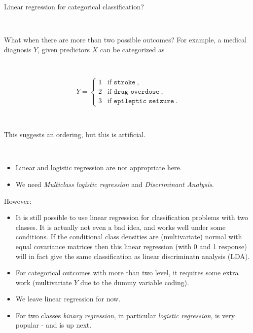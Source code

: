 \documentclass[10pt,ignorenonframetext,]{beamer}
\providecommand{\tightlist}{%
  \setlength{\itemsep}{0pt}\setlength{\parskip}{0pt}}
\begin{document}
\begin{frame}

\begin{block}{Linear regression for categorical classification?}

\(~\)

What when there are more than two possible outcomes? For example, a
medical diagnosis \(Y\), given predictors \(X\) can be categorized as

\(~\)

\[Y = \left\{ \begin{array}{ll}
1 & \text{if } \texttt{stroke} \ , \\
2 & \text{if } \texttt{drug overdose} \ , \\
3 & \text{if } \texttt{epileptic seizure} \ .
\end{array} \right.\]

\(~\)

This suggests an ordering, but this is artificial.

\(~\)

\begin{itemize}
\tightlist
\item
  Linear and logistic regression are not appropriate here.
\item
  We need \emph{Multiclass logistic regression} and \emph{Discriminant
  Analysis}.
\end{itemize}

\end{block}

\end{frame}

\begin{frame}

\begin{block}{However:}

\begin{itemize}
\item
  It is still possible to use linear regression for classification
  problems with two classes. It is actually not even a bad idea, and
  works well under some conditions. If the conditional class densities
  are (multivariate) normal with equal covariance matrices then this
  linear regression (with 0 and 1 response) will in fact give the same
  classification as linear discriminatn analysis (LDA).
\item
  For categorical outcomes with more than two level, it requires some
  extra work (multivariate \(Y\) due to the dummy variable coding).
\item
  We leave linear regression for now.
\item
  For two classes \emph{binary regression}, in particular \emph{logistic
  regression}, is very popular - and is up next.
\end{itemize}

\end{block}

\end{frame}
\end{document}
